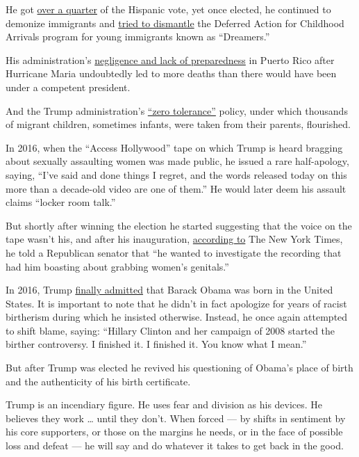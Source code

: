 He got \href{https://www.cnn.com/election/2016/results/exit-polls}{over
a quarter} of the Hispanic vote, yet once elected, he continued to
demonize immigrants and
\href{https://www.foxnews.com/politics/trump-says-he-will-sign-order-to-provide-road-to-citizenship-for-dreamers}{tried
to dismantle} the Deferred Action for Childhood Arrivals program for
young immigrants known as ``Dreamers.''

His administration's
\href{https://www.nytimes.com/2018/07/12/us/fema-puerto-rico-maria.html}{negligence
and lack of preparedness} in Puerto Rico after Hurricane Maria
undoubtedly led to more deaths than there would have been under a
competent president.

And the Trump administration's
\href{https://www.splcenter.org/news/2020/06/17/family-separation-under-trump-administration-timeline}{``zero
tolerance''} policy, under which thousands of migrant children,
sometimes infants, were taken from their parents, flourished.

In 2016, when the ``Access Hollywood'' tape on which Trump is heard
bragging about sexually assaulting women was made public, he issued a
rare half-apology, saying, ``I've said and done things I regret, and the
words released today on this more than a decade-old video are one of
them.'' He would later deem his assault claims ``locker room talk.''

But shortly after winning the election he started suggesting that the
voice on the tape wasn't his, and after his inauguration,
\href{https://www.nytimes.com/2017/11/28/us/politics/trump-access-hollywood-tape.html}{according
to} The New York Times, he told a Republican senator that ``he wanted to
investigate the recording that had him boasting about grabbing women's
genitals.''

In 2016, Trump
\href{https://www.youtube.com/watch?v=fjHPDzUOe2U}{finally admitted}
that Barack Obama was born in the United States. It is important to note
that he didn't in fact apologize for years of racist birtherism during
which he insisted otherwise. Instead, he once again attempted to shift
blame, saying: ``Hillary Clinton and her campaign of 2008 started the
birther controversy. I finished it. I finished it. You know what I
mean.''

But after Trump was elected he revived his questioning of Obama's place
of birth and the authenticity of his birth certificate.

Trump is an incendiary figure. He uses fear and division as his devices.
He believes they work \ldots{} until they don't. When forced --- by
shifts in sentiment by his core supporters, or those on the margins he
needs, or in the face of possible loss and defeat --- he will say and do
whatever it takes to get back in the good.


